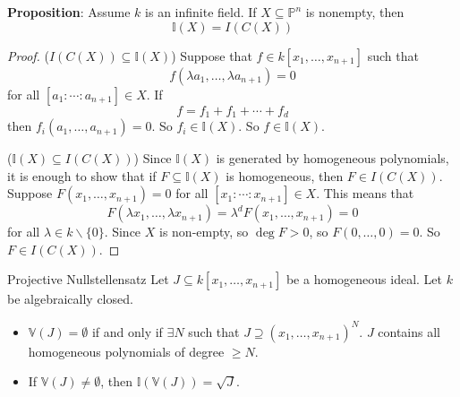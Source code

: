 \documentclass{report}
\begin{document}
\textbf{Proposition}: Assume $k$ is an infinite field. If $X \subseteq \mathbb{P}^{n}$ is nonempty, then 
    \begin{equation*}
        \mathbb{I}(X) = I(C(X))
    \end{equation*}
    \begin{proof}
        ($I(C(X)) \subseteq \mathbb{I}(X)$) Suppose that $f \in k[x_{1}, \ldots, x_{n + 1}]$ such that
            \begin{equation*}
                f(\lambda a_{1}, \ldots, \lambda a_{n + 1}) = 0
            \end{equation*}
        for all $[a_{1} : \cdots : a_{n + 1}] \in X$. If 
            \begin{equation*}
                f = f_{1} + f_{1} + \cdots + f_{d}
            \end{equation*}
        then $f_{i}(a_{1}, \ldots, a_{n + 1}) =0$. So $f_{i} \in \mathbb{I}(X)$. So $f \in \mathbb{I}(X)$.

        ($\mathbb{I}(X) \subseteq I(C(X))$) Since $\mathbb{I}(X)$ is generated by homogeneous polynomials, it is enough to show that if $F \subseteq \mathbb{I}(X)$ is homogeneous, then $F \in I(C(X))$. Suppose $F(x_{1}, \ldots, x_{n + 1}) = 0$ for all $[x_{1} : \cdots : x_{n + 1}] \in X$. This means that
            \begin{equation*}
                F(\lambda x_{1}, \ldots, \lambda x_{n + 1}) = \lambda^{d}F(x_{1}, \ldots, x_{n + 1}) = 0
            \end{equation*}
        for all $\lambda \in k \backslash \{0\}$. Since $X$ is non-empty, so $\deg F > 0$, so $F(0, \ldots, 0) = 0$. So $F \in I(C(X))$.
    \end{proof}

\begin{theorem}{Projective Nullstellensatz}
    Let $J \subseteq k[x_{1}, \ldots, x_{n + 1}]$ be a homogeneous ideal. Let $k$ be algebraically closed. 
        \begin{itemize}
            \item  $\mathbb{V}(J) = \emptyset$ if and only if $\exists N$ such that $J \supseteq (x_{1}, \ldots, x_{n + 1})^{N}$. $J$ contains all homogeneous polynomials of degree $ \geq N$.

            \item  If $\mathbb{V}(J) \neq  \emptyset$, then $\mathbb{I}(\mathbb{V}(J)) = \sqrt{J}$.
        \end{itemize}
\end{theorem}
\end{document}
